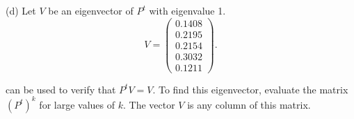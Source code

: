 \documentclass{ximera}
\begin{document}
\begin{computerExercise}
\begin{solution}
(d) \ans Let $V$ be an eigenvector of $P^t$ with eigenvalue 1.
\[
V = \left(\begin{array}{r} 0.1408 \\ 0.2195 \\ 0.2154 \\ 0.3032
\\ 0.1211 \end{array}\right).
\]

\soln \Matlab can be used to verify that $P^tV = V$.  To find this
eigenvector, evaluate the matrix $(P^t)^k$ for large values of $k$.
The vector $V$ is any column of this matrix.

\end{solution}
\end{computerExercise}
\end{document}
